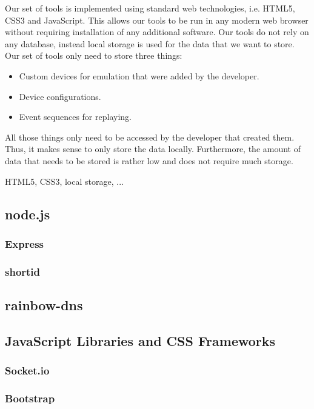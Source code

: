 Our set of tools is implemented using standard web technologies, i.e. HTML5, CSS3 and JavaScript. This allows our tools to be run in any modern web browser without requiring installation of any additional software. Our tools do not rely on any database, instead local storage is used for the data that we want to store. Our set of tools only need to store three things:
\begin{itemize}
	\item Custom devices for emulation that were added by the developer.
	\item Device configurations.
	\item Event sequences for replaying.
\end{itemize}
All those things only need to be accessed by the developer that created them. Thus, it makes sense to only store the data locally. Furthermore, the amount of data that needs to be stored is rather low and does not require much storage. 

HTML5, CSS3, local storage, ...

\subsection{node.js}

\subsubsection{Express}

\subsubsection{shortid}

\subsection{rainbow-dns}

\subsection{JavaScript Libraries and CSS Frameworks}

\subsubsection{Socket.io}

\subsubsection{Bootstrap}

